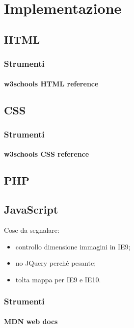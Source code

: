 \section{Implementazione}
\label{implementazione}

\subsection{HTML}
\label{implementazione-html}

\subsubsection{Strumenti}
\label{implementazione-html-strumenti}

\paragraph{w3schools HTML reference}
\label{implementazione-html-strumenti-w3schools-reference}


\subsection{CSS}
\label{implementazione-css}

\subsubsection{Strumenti}
\label{implementazione-css-strumenti}

\paragraph{w3schools CSS reference}
\label{implementazione-css-strumenti-w3schools-reference}

\subsection{PHP}
\label{implementazione-php}

\subsection{JavaScript}
\label{implementazione-javascript}
Cose da segnalare:
\begin{itemize}
	\item controllo dimensione immagini in IE9;
	\item no JQuery perché pesante;
	\item tolta mappa per IE9 e IE10.
\end{itemize}

\subsubsection{Strumenti}
\label{implementazione-javascript-strumenti}

\paragraph{MDN web docs}
\label{implementazione-javascript-strumenti-mdn}